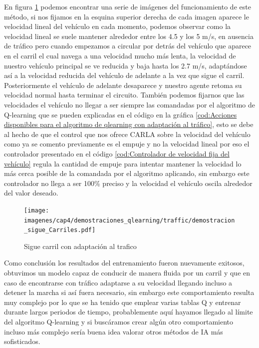 En figura \ref{fig:Sigue carriles con adaptación al trafico basado en Qlearning} podemos encontrar una serie de imágenes del funcionamiento de este método, si nos fijamos en la esquina superior derecha de cada imagen aparece le velocidad lineal del vehículo en cada momento, podemos observar como la velocidad lineal se suele mantener alrededor entre los 4.5 y los 5 m/s, en ausencia de tráfico pero cuando empezamos a circular por detrás del vehículo que aparece en el carril el cual navega a una velocidad mucho más lenta, la velocidad de nuestro vehículo principal se ve reducida y baja hasta los 2.7 m/s, adaptándose así a la velocidad reducida del vehículo de adelante a la vez que sigue el carril. Posteriormente el vehículo de adelante desaparece y nuestro agente retoma su velocidad normal hasta terminar el circuito. También podemos fijarnos que las velocidades el vehículo no llegar a ser siempre las comandadas por el algoritmo de Q-learning que se pueden explicadas en el código en la gráfica \ref{cod:Acciones disponibles para el algoritmo de qlearning con adaptación al tráfico}, esto se debe al hecho de que el control que nos ofrece CARLA sobre la velocidad del vehículo como ya se comento previamente es el empuje y no la velocidad lineal por eso el controlador presentado en el código \ref{cod:Controlador de velocidad fija del vehículo} regula la cantidad de empuje para intentar mantener la velocidad lo más cerca posible de la comandada por el algoritmo aplicando, sin embargo este controlador no llega a ser 100\% preciso y la velocidad el vehículo oscila alrededor del valor deseado.

\bigskip

  \begin{figure}[h]
    \centering
    \texttt{[image: imagenes/cap4/demostraciones\_qlearning/traffic/demostracion\_sigue\_Carriles.pdf]}
    \caption{Sigue carril con adaptación al trafico}
    \label{fig:Sigue carriles con adaptación al trafico basado en Qlearning}
\end{figure}

\newpage

Como conclusión los resultados del entrenamiento fueron nuevamente exitosos, obtuvimos un modelo capaz de conducir de manera fluida por un carril y que en caso de encontrarse con tráfico adaptarse a su velocidad llegando incluso a detener la marcha si así fuera necesario, sin embargo este comportamiento resulta muy complejo por lo que se ha tenido que emplear varias tablas Q y entrenar durante largos periodos de tiempo, probablemente aquí hayamos llegado al límite del algoritmo Q-learning y si buscáramos crear algún otro comportamiento incluso más complejo sería buena idea valorar otros métodos de \ac{IA} más sofisticados.
\bigskip

